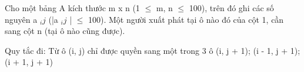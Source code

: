 Cho một bảng A kích thước m x n (1  $\le$  m, n  $\le$  100), trên đó ghi các số nguyên a   $_    ij   $   (|a   $_    ij   $   |  $\le$  100). Một người xuất phát tại ô nào đó của cột 1, cần sang cột n (tại ô nào cũng được).  

   Quy tắc đi: Từ ô (i, j) chỉ được quyền sang một trong 3 ô (i, j + 1); (i - 1, j + 1); (i + 1, j + 1)